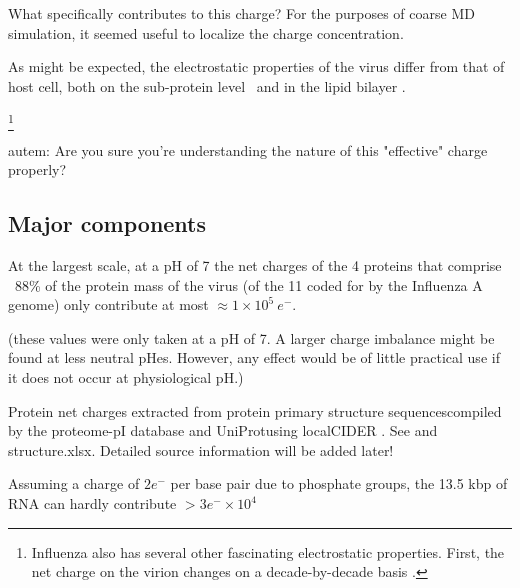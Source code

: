 \documentclass[paper.tex]{subfiles}
\begin{document}
What specifically contributes to this charge? For the purposes of coarse MD simulation, it seemed useful to localize the charge concentration. 

As might be expected, the electrostatic properties of the virus differ from that of host cell, both on the sub-protein level\cite{Icosahedral2019} \footnotemark \ and in the lipid bilayer \cite{Lipid2015} \footnotemark. 



\footnote{Influenza also has several other fascinating electrostatic properties. First, the net charge on the virion changes on a decade-by-decade basis \cite{Dynamics2010}. }

\begin{autem}
	autem: Are you sure you're understanding the nature of this "effective" charge properly?
\end{autem}

\subsection{Major components}

At the largest scale, at a pH of 7 the net charges of the 4 proteins that comprise ~88\% of the protein mass\cite{Quantitative1981} of the virus (of the 11 coded for by the Influenza A genome) only contribute at most  $\approx 1 \times 10^5\  e^-$.









(these values were only taken at a pH of 7. A larger charge imbalance might be found at less neutral pHes. However, any effect would be of little practical use if it does not occur at physiological pH.)

\begin{sidenote}
Protein net charges extracted from protein primary structure sequences\footnotemark compiled by the proteome-pI database \cite{ProteomepI2017} and UniProt\footnotemark using localCIDER \cite{CIDER2017}. See  and structure.xlsx. Detailed source information will be added later!
\end{sidenote}
Assuming a charge of $2e^-$ per base pair due to phosphate groups, the 13.5 kbp of RNA can hardly contribute $> 3e^- \times10^4$
\end{document}

